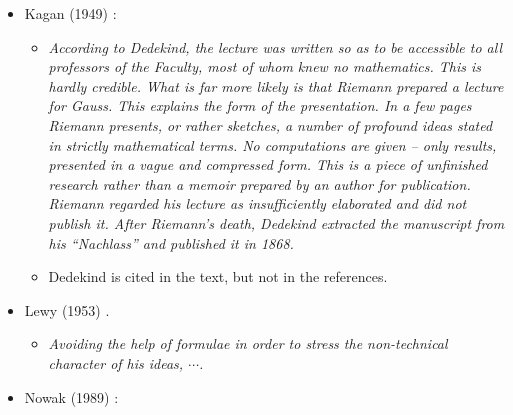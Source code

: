 \documentclass[12pt]{article}
\begin{document}
\begin{itemize}

\item[$\bullet$]Kagan (1949) \cite{Kagan1949}:

\begin{itemize}

\item[]{\it According to Dedekind, the lecture was written so as to be accessible to all professors of the Faculty, most of whom knew no mathematics. This is hardly credible. What is far more likely is that Riemann prepared a lecture for Gauss. This explains the form of the presentation. In a few pages Riemann presents, or rather sketches, a number of profound ideas stated in strictly mathematical terms. No computations are given -- only results, presented in a vague and compressed form. This is a piece of unfinished research rather than a memoir prepared by an author for publication. Riemann regarded his lecture as insufficiently elaborated and did not publish it. After Riemann's death, Dedekind extracted the manuscript from his ``Nachlass'' and published it in 1868.}

\item[$\bullet$]Dedekind is cited in the text, but not in the references.

\end{itemize}

\item[$\bullet$]Lewy (1953) \cite{Lewy1953}.

\begin{itemize}

\item[]{\it Avoiding the help of formulae in order to stress the non-technical character of his ideas, $\cdots$.}

\end{itemize}

\item[$\bullet$]Nowak (1989) \cite{Nowak1989}:

\begin{itemize}


\end{itemize}
\end{itemize}
\end{document}
